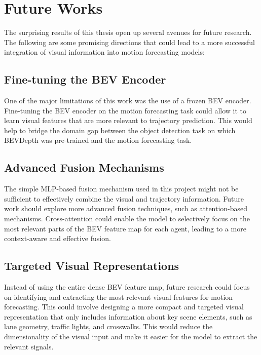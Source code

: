 \section{Future Works}

The surprising results of this thesis open up several avenues for future research. The following are some promising directions that could lead to a more successful integration of visual information into motion forecasting models:

\subsection{Fine-tuning the BEV Encoder}

One of the major limitations of this work was the use of a frozen BEV encoder. Fine-tuning the BEV encoder on the motion forecasting task could allow it to learn visual features that are more relevant to trajectory prediction. This would help to bridge the domain gap between the object detection task on which BEVDepth was pre-trained and the motion forecasting task.

\subsection{Advanced Fusion Mechanisms}

The simple MLP-based fusion mechanism used in this project might not be sufficient to effectively combine the visual and trajectory information. Future work should explore more advanced fusion techniques, such as attention-based mechanisms. Cross-attention could enable the model to selectively focus on the most relevant parts of the BEV feature map for each agent, leading to a more context-aware and effective fusion.

\subsection{Targeted Visual Representations}

Instead of using the entire dense BEV feature map, future research could focus on identifying and extracting the most relevant visual features for motion forecasting. This could involve designing a more compact and targeted visual representation that only includes information about key scene elements, such as lane geometry, traffic lights, and crosswalks. This would reduce the dimensionality of the visual input and make it easier for the model to extract the relevant signals.

